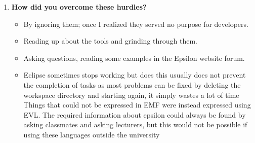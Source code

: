 \documentclass[12pt, a4paper]{report}
\begin{document}
\begin{appendices}
\begin{enumerate}
\item \textbf{How did you overcome these hurdles?}
\begin{itemize}
\item By ignoring them; once I realized they served no purpose for developers.
\item Reading up about the tools and grinding through them.
\item Asking questions, reading some examples in the Epsilon website forum.
\item Eclipse sometimes stops working but does this usually does not prevent the completion of tasks as most problems can be fixed by deleting the workspace directory and starting again, it simply wastes a lot of time Things that could not be expressed in EMF were instead expressed using EVL. The required information about epsilon could always be found by
asking classmates and asking lecturers, but this would not be possible if using these languages outside the university
\end{itemize}


\end{enumerate}

\end{appendices}
\end{document}
